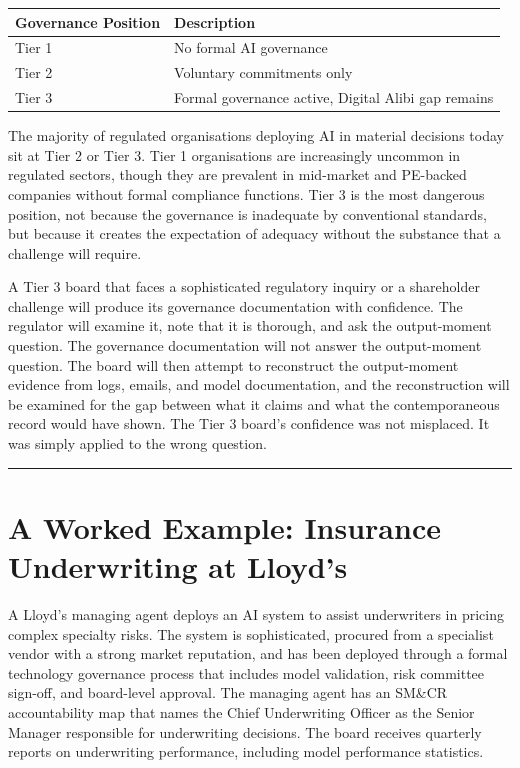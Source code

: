 \begin{longtable}[]{@{}ll@{}}
\toprule\noalign{}
Governance Position & Description \\
\midrule\noalign{}
\endhead
\bottomrule\noalign{}
\endlastfoot
Tier 1 & No formal AI governance \\
Tier 2 & Voluntary commitments only \\
Tier 3 & Formal governance active, Digital Alibi gap remains \\
\end{longtable}

The majority of regulated organisations deploying AI in material decisions today sit at Tier 2 or Tier 3. Tier 1 organisations are increasingly uncommon in regulated sectors, though they are prevalent in mid-market and PE-backed companies without formal compliance functions. Tier 3 is the most dangerous position, not because the governance is inadequate by conventional standards, but because it creates the expectation of adequacy without the substance that a challenge will require.

A Tier 3 board that faces a sophisticated regulatory inquiry or a shareholder challenge will produce its governance documentation with confidence. The regulator will examine it, note that it is thorough, and ask the output-moment question. The governance documentation will not answer the output-moment question. The board will then attempt to reconstruct the output-moment evidence from logs, emails, and model documentation, and the reconstruction will be examined for the gap between what it claims and what the contemporaneous record would have shown. The Tier 3 board's confidence was not misplaced. It was simply applied to the wrong question.

\begin{center}\rule{0.5\linewidth}{0.5pt}\end{center}

\section{A Worked Example: Insurance Underwriting at Lloyd's}

A Lloyd's managing agent deploys an AI system to assist underwriters in pricing complex specialty risks. The system is sophisticated, procured from a specialist vendor with a strong market reputation, and has been deployed through a formal technology governance process that includes model validation, risk committee sign-off, and board-level approval. The managing agent has an SM\&CR accountability map that names the Chief Underwriting Officer as the Senior Manager responsible for underwriting decisions. The board receives quarterly reports on underwriting performance, including model performance statistics.

